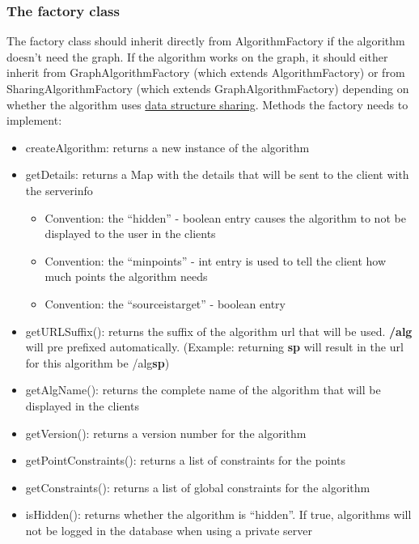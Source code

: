 \documentclass[ngerman,titlepage,parskip=true]{scrartcl}
\begin{document}
	 \subsubsection{The factory class}
	 The factory class should inherit directly from AlgorithmFactory if the algorithm doesn't need the graph. If the algorithm works on the graph, it should either inherit from GraphAlgorithmFactory (which extends AlgorithmFactory) or from SharingAlgorithmFactory (which extends GraphAlgorithmFactory) depending on whether the algorithm uses \hyperref[sharing]{data structure sharing}.
	 Methods the factory needs to implement:
	 \begin{itemize}
	   \item createAlgorithm: returns a new instance of the algorithm
	   \item getDetails: returns a Map with the details that will be sent to the client with the serverinfo
	   \begin{itemize}
	     \item Convention: the ``hidden'' - boolean entry causes the algorithm to not be displayed to the user in the clients
	     \item Convention: the ``minpoints'' - int entry is used to tell the client how much points the algorithm needs
	     \item Convention: the ``sourceistarget'' - boolean entry 
	   \end{itemize}
		\item getURLSuffix(): returns the suffix of the algorithm url that will be used. \textbf{/alg} will pre prefixed automatically. (Example: returning \textbf{sp} will result in the url for this algorithm be /alg\textbf{sp})
		\item getAlgName(): returns the complete name of the algorithm that will be displayed in the clients
		\item getVersion(): returns a version number for the algorithm
		\item getPointConstraints(): returns a list of constraints for the points
		\item getConstraints(): returns a list of global constraints for the algorithm
		\item isHidden(): returns whether the algorithm is ``hidden''. If true, algorithms will not be logged in the database when using a private server
	 \end{itemize}
	 
  \label{sharing}
\end{document}
